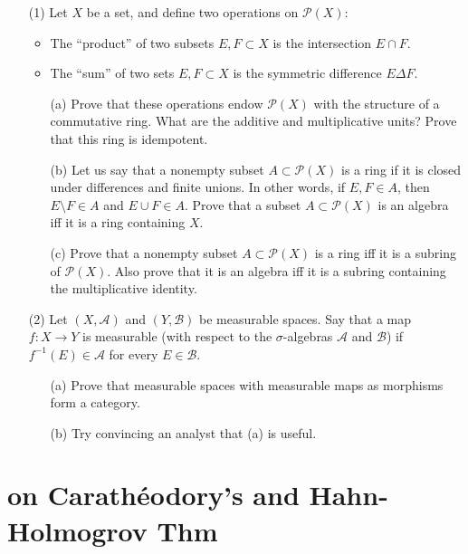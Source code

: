 \documentclass[lang=cn,11pt]{elegantbook}
\begin{document}
\begin{itemize}
    \item[(1)] Let $X$ be a set, and define two operations on $\mathcal{P}(X)$:
    \begin{itemize}
        \item The “product” of two subsets $E, F \subset X$ is the intersection $E \cap F$.
        \item The “sum” of two sets $E, F \subset X$ is the symmetric difference $E \Delta F$.
    \end{itemize}
    \begin{itemize}
        \item[(a)] Prove that these operations endow $\mathcal{P}(X)$ with the structure of a commutative ring. What are the additive and multiplicative units? Prove that this ring is idempotent.
        \item[(b)] Let us say that a nonempty subset $A \subset \mathcal{P}(X)$ is a ring if it is closed under differences and finite unions. In other words, if $E, F \in A$, then $E \setminus F \in A$ and $E \cup F \in A$. Prove that a subset $A \subset \mathcal{P}(X)$ is an algebra iff it is a ring containing $X$.
        \item[(c)] Prove that a nonempty subset $A \subset \mathcal{P}(X)$ is a ring iff it is a subring of $\mathcal{P}(X)$. Also prove that it is an algebra iff it is a subring containing the multiplicative identity.
    \end{itemize}
    \item[(2)] Let $(X, \mathcal{A})$ and $(Y, \mathcal{B})$ be measurable spaces. Say that a map $f : X \to Y$ is measurable (with respect to the $\sigma$-algebras $\mathcal{A}$ and $\mathcal{B}$) if $f^{-1}(E) \in \mathcal{A}$ for every $E \in \mathcal{B}$.
    \begin{itemize}
        \item[(a)] Prove that measurable spaces with measurable maps as morphisms form a category.
        \item[(b)] Try convincing an analyst that (a) is useful.
    \end{itemize}
\end{itemize}





\chapter{on Carathéodory's and Hahn-Holmogrov Thm}
\end{document}
